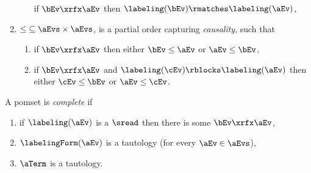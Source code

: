 \begin{definition}
\begin{enumerate}[,label=(\textsc{m}\arabic*),ref=\textsc{m}\arabic*]
\begin{enumerate}
      if $\bEv\xrfx\aEv$ then $\labeling(\bEv) \rmatches \labeling(\aEv)$,
    \end{enumerate}
  \item \label{pom-le} 
    ${\le} \subseteq \aEvs\times\aEvs$, is a partial order capturing
    \emph{causality}, such that
    \begin{enumerate}
    \item \label{pom-le-match}
      if $\bEv\xrfx\aEv$ then either $\bEv\le\aEv$ or $\aEv\le\bEv$,
    \item \label{pom-le-block}
      if $\bEv\xrfx\aEv$ and $\labeling(\cEv) \rblocks \labeling(\aEv)$ then either $\cEv\le\bEv$ or $\aEv\le\cEv$.
    \end{enumerate}
  \end{enumerate}
  A pomset is \emph{complete} if
  \begin{enumerate}[,label=(\textsc{c}\arabic*),ref=\textsc{c}\arabic*]
    \setcounter{enumi}{\value{Blambda}}
  \item \label{top-rf}
    if $\labeling(\aEv)$ is a $\sread$ then there is some $\bEv\xrfx\aEv$,
    \setcounter{enumi}{\value{Bkappa}}
  \item \label{top-kappa}
    $\labelingForm(\aEv)$ is a tautology (for every $\aEv\in\aEvs$),
    \setcounter{enumi}{\value{Bterm}}
  \item \label{top-term}
    $\aTerm$ is a tautology.
  \end{enumerate}
\end{definition}



